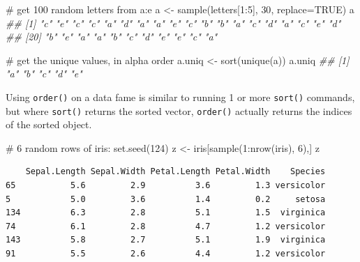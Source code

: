\documentclass[
  13,
  letterpaper,
]{report}
\newenvironment{Shaded}{\begin{snugshade}}{\end{snugshade}}
\newcommand{\AttributeTok}[1]{\textcolor[rgb]{0.40,0.45,0.13}{#1}}
\newcommand{\CommentTok}[1]{\textcolor[rgb]{0.37,0.37,0.37}{#1}}
\newcommand{\ConstantTok}[1]{\textcolor[rgb]{0.56,0.35,0.01}{#1}}
\newcommand{\DecValTok}[1]{\textcolor[rgb]{0.68,0.00,0.00}{#1}}
\newcommand{\DocumentationTok}[1]{\textcolor[rgb]{0.37,0.37,0.37}{\textit{#1}}}
\newcommand{\FunctionTok}[1]{\textcolor[rgb]{0.28,0.35,0.67}{#1}}
\newcommand{\NormalTok}[1]{\textcolor[rgb]{0.00,0.23,0.31}{#1}}
\newcommand{\OtherTok}[1]{\textcolor[rgb]{0.00,0.23,0.31}{#1}}
\newcommand{\SpecialCharTok}[1]{\textcolor[rgb]{0.37,0.37,0.37}{#1}}
\begin{document}
\begin{Shaded}
\begin{Highlighting}[]
\CommentTok{\# get 100 random letters from a:e}
\NormalTok{a }\OtherTok{\textless{}{-}} \FunctionTok{sample}\NormalTok{(letters[}\DecValTok{1}\SpecialCharTok{:}\DecValTok{5}\NormalTok{], }\DecValTok{30}\NormalTok{, }\AttributeTok{replace=}\ConstantTok{TRUE}\NormalTok{)}
\NormalTok{a}
\DocumentationTok{\#\#  [1] "c" "e" "c" "c" "a" "d" "a" "a" "e" "c" "b" "b" "a" "c" "d" "a" "c" "e" "d"}
\DocumentationTok{\#\# [20] "b" "e" "a" "a" "b" "c" "d" "e" "e" "c" "a"}

\CommentTok{\# get the unique values, in alpha order}
\NormalTok{a.uniq }\OtherTok{\textless{}{-}} \FunctionTok{sort}\NormalTok{(}\FunctionTok{unique}\NormalTok{(a))}
\NormalTok{a.uniq}
\DocumentationTok{\#\# [1] "a" "b" "c" "d" "e"}
\end{Highlighting}
\end{Shaded}

Using \texttt{order()} on a data fame is similar to running 1 or more
\texttt{sort()} commands, but where \texttt{sort()} returns the sorted
vector, \texttt{order()} actually returns the indices of the sorted
object.

\begin{Shaded}
\begin{Highlighting}[]
\CommentTok{\# 6 random rows of iris:}
\FunctionTok{set.seed}\NormalTok{(}\DecValTok{124}\NormalTok{)}
\NormalTok{z }\OtherTok{\textless{}{-}}\NormalTok{ iris[}\FunctionTok{sample}\NormalTok{(}\DecValTok{1}\SpecialCharTok{:}\FunctionTok{nrow}\NormalTok{(iris), }\DecValTok{6}\NormalTok{),]}
\NormalTok{z}
\end{Highlighting}
\end{Shaded}

\begin{verbatim}
    Sepal.Length Sepal.Width Petal.Length Petal.Width    Species
65           5.6         2.9          3.6         1.3 versicolor
5            5.0         3.6          1.4         0.2     setosa
134          6.3         2.8          5.1         1.5  virginica
74           6.1         2.8          4.7         1.2 versicolor
143          5.8         2.7          5.1         1.9  virginica
91           5.5         2.6          4.4         1.2 versicolor
\end{verbatim}

\begin{Shaded}
\end{Shaded}
\end{document}

